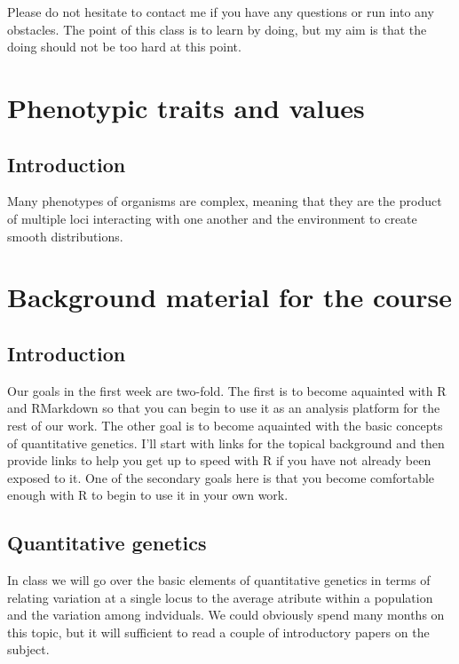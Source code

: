 \documentclass[]{book}
\begin{document}
Please do not hesitate to contact me if you have any questions or run into any obstacles. The point of this class is to learn by doing, but my aim is that the doing should not be too hard at this point.

\hypertarget{phenotypic-traits-and-values}{%
\chapter{Phenotypic traits and values}\label{phenotypic-traits-and-values}}

\hypertarget{introduction-1}{%
\section{Introduction}\label{introduction-1}}

Many phenotypes of organisms are complex, meaning that they are the product of multiple loci interacting with one another and the environment to create smooth distributions.

\hypertarget{background-material-for-the-course-1}{%
\chapter{Background material for the course}\label{background-material-for-the-course-1}}

\hypertarget{introduction-2}{%
\section{Introduction}\label{introduction-2}}

Our goals in the first week are two-fold. The first is to become aquainted with R and RMarkdown so that you can begin to use it as an analysis platform for the rest of our work. The other goal is to become aquainted with the basic concepts of quantitative genetics. I'll start with links for the topical background and then provide links to help you get up to speed with R if you have not already been exposed to it. One of the secondary goals here is that you become comfortable enough with R to begin to use it in your own work.

\hypertarget{quantitative-genetics-1}{%
\section{Quantitative genetics}\label{quantitative-genetics-1}}

In class we will go over the basic elements of quantitative genetics in terms of relating variation at a single locus to the average atribute within a population and the variation among indviduals. We could obviously spend many months on this topic, but it will sufficient to read a couple of introductory papers on the subject.
\end{document}
